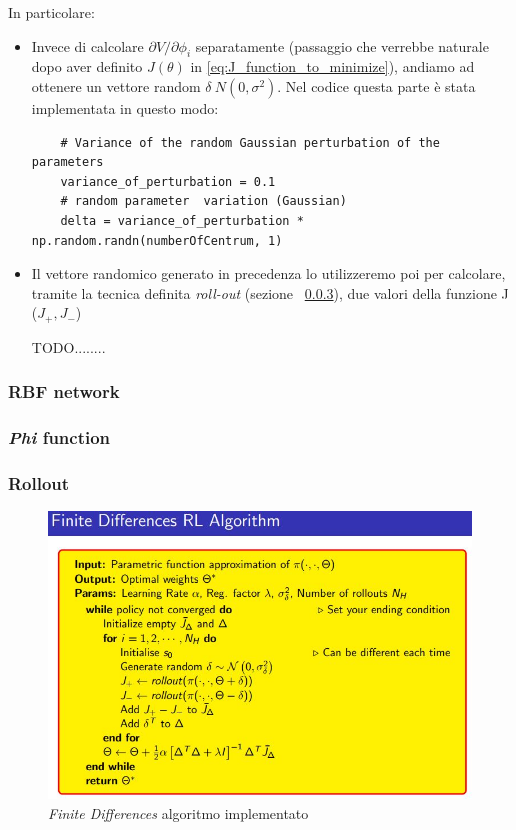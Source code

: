 In particolare:
\begin{itemize}
	\item Invece di calcolare $\partial V / \partial\phi_i$ separatamente (passaggio che verrebbe naturale dopo aver definito $J(\theta)$ in \ref{eq:J_function_to_minimize}), andiamo ad ottenere un vettore random $\delta ~ N (0, \sigma^2)$.
	Nel codice questa parte è stata implementata in questo modo:
	\begin{lstlisting}
	# Variance of the random Gaussian perturbation of the parameters
	variance_of_perturbation = 0.1 
	# random parameter 	variation (Gaussian)
	delta = variance_of_perturbation * np.random.randn(numberOfCentrum, 1) 
	\end{lstlisting}
	\item Il vettore randomico generato in precedenza lo utilizzeremo poi per calcolare, tramite la tecnica definita \textit{roll-out} (sezione ~\ref{sec:rollout}), due valori della funzione J ($J_+, J_-$)
	
	TODO........
	
\end{itemize}

\subsubsection{RBF network}
\label{sec:RBF}
\subsubsection{\textit{Phi} function}
\subsubsection{Rollout}
\label{sec:rollout}

\begin{figure}[!h]
	\centering
	\includegraphics[width=\textwidth]{Immagini/FD_Algorithm.JPG}
	\caption{\textit{Finite Differences} algoritmo implementato}
	\label{fig:Reward_FD}
\end{figure}



